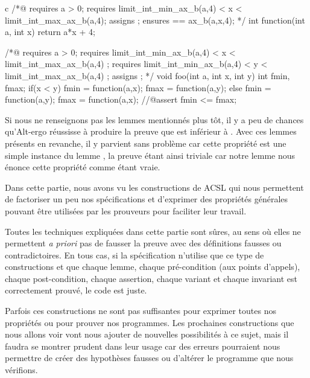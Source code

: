 \documentclass[middle]{zmdocument}
\begin{document}
\begin{CodeBlock}{c}
/*@
  requires a > 0;
  requires limit_int_min_ax_b(a,4) < x < limit_int_max_ax_b(a,4);
  assigns \nothing ;
  ensures \result == ax_b(a,x,4);
*/
int function(int a, int x){
  return a*x + 4;
}

/*@ 
  requires a > 0;
  requires limit_int_min_ax_b(a,4) < x < limit_int_max_ax_b(a,4) ;
  requires limit_int_min_ax_b(a,4) < y < limit_int_max_ax_b(a,4) ;
  assigns \nothing ;
*/
void foo(int a, int x, int y){
  int fmin, fmax;
  if(x < y){
    fmin = function(a,x);
    fmax = function(a,y);
  } else {
    fmin = function(a,y);
    fmax = function(a,x);
  }
  //@assert fmin <= fmax;
}
\end{CodeBlock}



Si nous ne renseignons pas les lemmes mentionnés plus tôt, il y a peu de chances 
qu'Alt-ergo réussisse à produire la preuve que  est inférieur à .
Avec ces lemmes présents en revanche, il y parvient sans problème car cette 
propriété est une simple instance du lemme , la preuve 
étant ainsi triviale car notre lemme nous énonce cette propriété comme étant vraie.



\horizontalLine



Dans cette partie, nous avons vu les constructions de ACSL qui nous permettent 
de factoriser un peu nos spécifications et d'exprimer des propriétés générales 
pouvant être utilisées par les prouveurs pour faciliter leur travail.



Toutes les techniques expliquées dans cette partie sont sûres, au sens où 
elles ne permettent \textit{a priori} pas de fausser la preuve avec des définitions 
fausses ou contradictoires. En tous cas, si la spécification n'utilise que ce
type de constructions et que chaque lemme, chaque pré-condition (aux points 
d'appels), chaque post-condition, chaque assertion, chaque variant et chaque 
invariant est correctement prouvé, le code est juste.



Parfois ces constructions ne sont pas suffisantes pour exprimer toutes nos 
propriétés ou pour prouver nos programmes. Les prochaines constructions que nous
allons voir vont nous ajouter de nouvelles possibilités à ce sujet, mais il 
faudra se montrer prudent dans leur usage car des erreurs pourraient nous 
permettre de créer des hypothèses fausses ou d'altérer le programme que nous 
vérifions.
\end{document}
